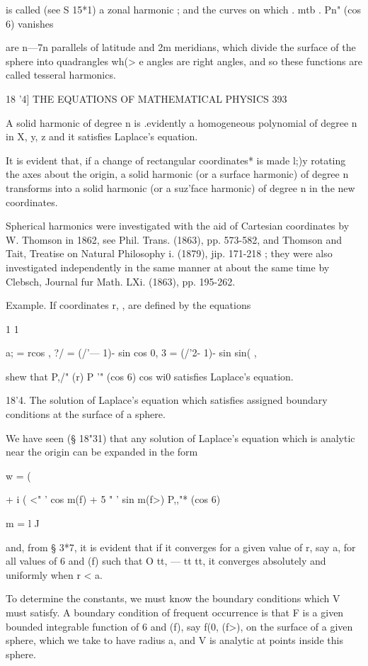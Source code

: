 is called (see S 15*1) a zonal harmonic ; and the curves on which . mtb . Pn"  (cos 6) vanishes 

are n—7n parallels of latitude and 2m meridians, which divide the surface of the sphere 
into quadrangles wh(> e angles are right angles, and so these functions are called tesseral 
harmonics. 



18 '4] THE EQUATIONS OF MATHEMATICAL PHYSICS 393 

A solid harmonic of degree n is .evidently a homogeneous polynomial of degree n in 
X, y, z and it satisfies Laplace's equation. 

It is evident that, if a change of rectangular coordinates* is made l;)y rotating the axes 
about the origin, a solid harmonic (or a surface harmonic) of degree n transforms into 
a solid harmonic (or a suz'face harmonic) of degree n in the new coordinates. 

Spherical harmonics were investigated with the aid of Cartesian coordinates by 
W. Thomson in 1862, see Phil. Trans. (1863), pp. 573-582, and Thomson and Tait, 
Treatise on Natural Philosophy i. (1879), jip. 171-218 ; they were also investigated 
independently in the same manner at about the same time by Clebsch, Journal fur Math. 
LXi. (1863), pp. 195-262. 

Example. If coordinates r,  ,   are defined by the equations 

1 1 

a; = rcos , ?/ = (/'— 1)- sin   cos 0, 3 = (/'2- 1)- sin  sin( , 

shew that P,/" (r) P '" (cos 6) cos wi0 satisfies Laplace's equation. 

18'4. The solution of Laplace's equation which satisfies assigned boundary 
conditions at the surface of a sphere. 

We have seen (§ 18"31) that any solution of Laplace's equation which 
is analytic near the origin can be expanded in the form 



w = ( 

+ i (  <" ' cos m(f) + 5 " ' sin m(f>) P,,"* (cos 6) \ 

m = l J 

and, from § 3*7, it is evident that if it converges for a given value of r, 
say a, for all values of 6 and (f) such that O  tt, — tt  tt, it converges 
absolutely and uniformly when r < a. 

To determine the constants, we must know the boundary conditions 
which V must satisfy. A boundary condition of frequent occurrence is 
that F is a given bounded integrable function of 6 and (f), say f(0, (f>), on 
the surface of a given sphere, which we take to have radius a, and V is 
analytic at points inside this sphere. 

